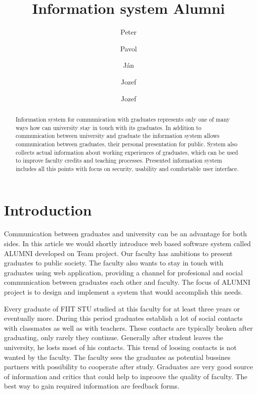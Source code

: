 \documentclass{iitsrc}[2006/14/02]
\title{Information system Alumni}
\author{Peter}{C\'ich}
\author{Pavol}{F\'abik}
\author{J\'an}{Garaj}
\author{Jozef}{Hergott}
\author{Jozef}{Hopko}
\begin{document}
\begin{abstract}
Information system for communication with graduates represents only one of many ways how can university stay in touch with its graduates. In addition to communication between university and graduate the information system allows communication between graduates, their personal presentation for public. System also collects actual information about working experiences of graduates, which can be used to improve faculty credits and teaching processes. Presented information system includes all this points with focus on security, usability and comfortable user interface.
\end{abstract}


\section{Introduction}

Communication between graduates and university can be an advantage for both sides. In this article we would shortly introduce web based software system called ALUMNI developed on Team project. Our faculty has ambitions to present graduates to public society. The faculty also wants to stay in touch with graduates using web application, providing a channel for profesional and social communication between graduates each other and faculty. The focus of ALUMNI project is to design and implement a system that would accomplish this needs. 

Every graduate of FIIT STU studied at this faculty for at least three years or eventually more. During this period graduates establish a lot of social contacts with classmates as well as with teachers. These contacts are typically broken after graduating, only rarely they continue. Generally after student leaves the university, he losts most of his contacts. This trend of loosing contacts is not wanted by the faculty. The faculty sees the graduates as potential bussines partners with possibility to cooperate after study. Graduates are very good source of information and critics that could help to inproove the quality of faculty. The best way to gain required information are feedback forms.

\end{document}
